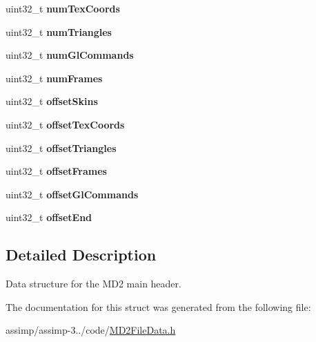 \begin{DoxyCompactItemize}
\item 
\hypertarget{struct_assimp_1_1_m_d2_1_1_header_a1b1b28d5aa5282bee892b429f8170ea2}{uint32\+\_\+t {\bfseries num\+Tex\+Coords}}\label{struct_assimp_1_1_m_d2_1_1_header_a1b1b28d5aa5282bee892b429f8170ea2}

\item 
\hypertarget{struct_assimp_1_1_m_d2_1_1_header_abc98b72ef057343bc1d2472593223cbd}{uint32\+\_\+t {\bfseries num\+Triangles}}\label{struct_assimp_1_1_m_d2_1_1_header_abc98b72ef057343bc1d2472593223cbd}

\item 
\hypertarget{struct_assimp_1_1_m_d2_1_1_header_a5783d52cf745a7ecddd07d3c406dc132}{uint32\+\_\+t {\bfseries num\+Gl\+Commands}}\label{struct_assimp_1_1_m_d2_1_1_header_a5783d52cf745a7ecddd07d3c406dc132}

\item 
\hypertarget{struct_assimp_1_1_m_d2_1_1_header_a1ae5e0158f79f6e9341de96687f30e99}{uint32\+\_\+t {\bfseries num\+Frames}}\label{struct_assimp_1_1_m_d2_1_1_header_a1ae5e0158f79f6e9341de96687f30e99}

\item 
\hypertarget{struct_assimp_1_1_m_d2_1_1_header_a5e3ff5f7fe1c300e439720fab660803c}{uint32\+\_\+t {\bfseries offset\+Skins}}\label{struct_assimp_1_1_m_d2_1_1_header_a5e3ff5f7fe1c300e439720fab660803c}

\item 
\hypertarget{struct_assimp_1_1_m_d2_1_1_header_a35364411d73d9bf8cab43dd0c6650420}{uint32\+\_\+t {\bfseries offset\+Tex\+Coords}}\label{struct_assimp_1_1_m_d2_1_1_header_a35364411d73d9bf8cab43dd0c6650420}

\item 
\hypertarget{struct_assimp_1_1_m_d2_1_1_header_a67819f247964f92d0c7dae6b275bb7f2}{uint32\+\_\+t {\bfseries offset\+Triangles}}\label{struct_assimp_1_1_m_d2_1_1_header_a67819f247964f92d0c7dae6b275bb7f2}

\item 
\hypertarget{struct_assimp_1_1_m_d2_1_1_header_a879100497a4488b18c1b64a9fa96e194}{uint32\+\_\+t {\bfseries offset\+Frames}}\label{struct_assimp_1_1_m_d2_1_1_header_a879100497a4488b18c1b64a9fa96e194}

\item 
\hypertarget{struct_assimp_1_1_m_d2_1_1_header_a919d80d4af344cf2c9fbf35c0994a813}{uint32\+\_\+t {\bfseries offset\+Gl\+Commands}}\label{struct_assimp_1_1_m_d2_1_1_header_a919d80d4af344cf2c9fbf35c0994a813}

\item 
\hypertarget{struct_assimp_1_1_m_d2_1_1_header_a50dc71178025c70dfe8cc3a7ca655d84}{uint32\+\_\+t {\bfseries offset\+End}}\label{struct_assimp_1_1_m_d2_1_1_header_a50dc71178025c70dfe8cc3a7ca655d84}

\end{DoxyCompactItemize}


\subsection{Detailed Description}
Data structure for the M\+D2 main header. 

The documentation for this struct was generated from the following file\+:\begin{DoxyCompactItemize}
\item 
assimp/assimp-\/3../code/\hyperlink{_m_d2_file_data_8h}{M\+D2\+File\+Data.\+h}\end{DoxyCompactItemize}

